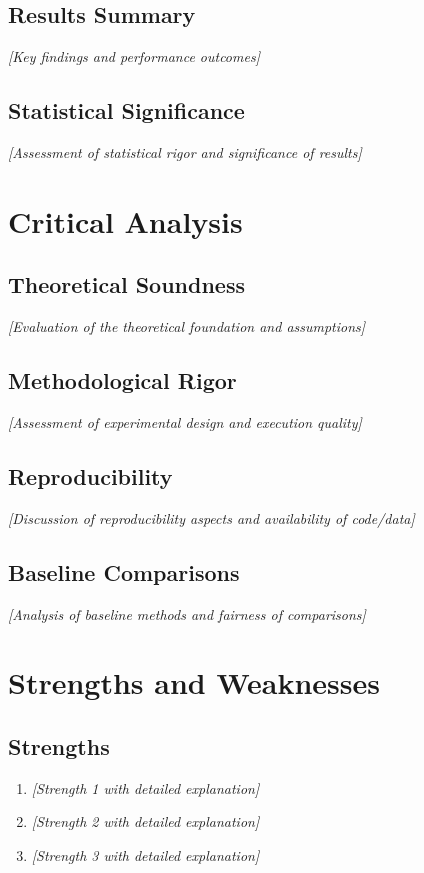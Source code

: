 \documentclass[12pt,a4paper]{article}
\begin{document}
\subsection{Results Summary}
\textit{[Key findings and performance outcomes]}

\subsection{Statistical Significance}
\textit{[Assessment of statistical rigor and significance of results]}

\section{Critical Analysis}

\subsection{Theoretical Soundness}
\textit{[Evaluation of the theoretical foundation and assumptions]}

\subsection{Methodological Rigor}
\textit{[Assessment of experimental design and execution quality]}

\subsection{Reproducibility}
\textit{[Discussion of reproducibility aspects and availability of code/data]}

\subsection{Baseline Comparisons}
\textit{[Analysis of baseline methods and fairness of comparisons]}

\section{Strengths and Weaknesses}

\subsection{Strengths}
\begin{enumerate}
    \item \textit{[Strength 1 with detailed explanation]}
    \item \textit{[Strength 2 with detailed explanation]}
    \item \textit{[Strength 3 with detailed explanation]}
\end{enumerate}
\end{document}
